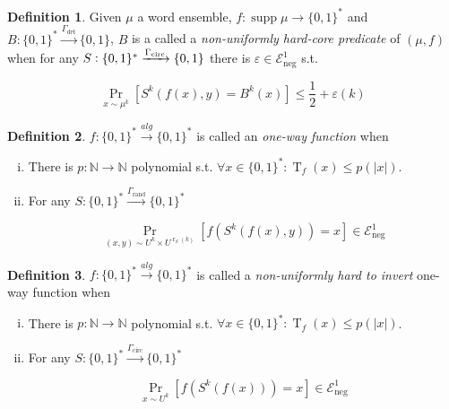 \documentclass{article}
\theoremstyle{definition}
\newtheorem{definition}{Definition}[section]
\theoremstyle{plain}
\newcommand{\Words}{{\{ 0, 1 \}^*}}
\newcommand{\Bool}{\{0,1\}}
\DeclareMathOperator{\Supp}{supp}
\DeclareMathOperator{\Prb}{Pr}
\DeclareMathOperator{\T}{T}
\DeclareMathOperator{\R}{r}
\newcommand{\Nats}{\mathbb{N}}
\newcommand{\Abs}[1]{\lvert #1 \rvert}
\begin{document}
\begin{samepage}
\begin{definition}

Given $\mu$ a word ensemble, $f: \Supp \mu \rightarrow \Words$ and ${B: \Words \xrightarrow{\Gamma_{\text{det}}} \Bool}$, $B$ is a called a \emph{non-uniformly hard-core predicate} of $(\mu,f)$ when for any ${S: \Words \xrightarrow{\Gamma_{\textnormal{circ}}} \Bool}$ there is $\varepsilon \in \mathcal{E}_{\text{neg}}^1$ s.t. 

\begin{equation}
\Prb_{x \sim \mu^k}[S^k(f(x),y)=B^k(x)] \leq \frac{1}{2} + \varepsilon(k)
\end{equation}

\end{definition}
\end{samepage}

\begin{samepage}
\begin{definition}

$f: \Words \xrightarrow{alg} \Words$ is called an \emph{one-way function}
when

\begin{enumerate}[(i)]

\item There is $p: \Nats \rightarrow \Nats$ polynomial s.t. $\forall x \in \Words: \T_f(x) \leq p(\Abs{x})$.

\item For any $S: \Words \xrightarrow{\Gamma_{\text{rand}}} \Words$

\begin{equation}
\Prb_{(x,y) \sim U^k \times U^{\R_S(k)}}[f(S^k(f(x),y))=x] \in \mathcal{E}_{\text{neg}}^1
\end{equation}

\end{enumerate}

\end{definition}
\end{samepage}

\begin{samepage}
\begin{definition}

$f: \Words \xrightarrow{alg} \Words$ is called a \emph{non-uniformly hard to invert} one-way function
when

\begin{enumerate}[(i)]

\item There is $p: \Nats \rightarrow \Nats$ polynomial s.t. $\forall x \in \Words: \T_f(x) \leq p(\Abs{x})$.

\item For any $S: \Words \xrightarrow{\Gamma_{\text{circ}}} \Words$

\begin{equation}
\Prb_{x \sim U^k}[f(S^k(f(x)))=x] \in \mathcal{E}_{\text{neg}}^1
\end{equation}

\end{enumerate}

\end{definition}
\end{samepage}
\end{document}
